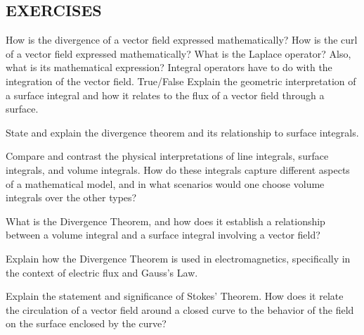 \begin{mdframed}[ backgroundcolor=lightblue, linewidth=1pt, hidealllines=true]
\section{EXERCISES}
\begin{ExerciseList}
\Exercise[label={ex171}] 
How is the divergence of a vector field expressed mathematically?
\Exercise[label={ex172}] 
How is the curl of a vector field expressed mathematically?
\Exercise[label={ex173}] 
What is the Laplace operator? Also, what is its mathematical expression?
\Exercise[label={ex174}]  Integral operators have to do with the integration of the vector field. True/False
\Exercise[label={ex175}]
Explain the geometric interpretation of a surface integral and how it relates to the flux of a vector field through a surface.


\Exercise[label={ex176}]
State and explain the divergence theorem and its relationship to surface integrals.


\Exercise[label={ex178}] 
Compare and contrast the physical interpretations of line integrals, surface integrals, and volume integrals. How do these integrals capture different aspects of a mathematical model, and in what scenarios would one choose volume integrals over the other types?


\Exercise[label={ex179}] 
What is the Divergence Theorem, and how does it establish a relationship between a volume integral and a surface integral involving a vector field?

\Exercise[label={ex1710}] 
Explain how the Divergence Theorem is used in electromagnetics, specifically in the context of electric flux and Gauss's Law.



\Exercise[label={ex1712}] 
Explain the statement and significance of Stokes' Theorem. How does it relate the circulation of a vector field around a closed curve to the behavior of the field on the surface enclosed by the curve?


\end{ExerciseList}
\end{mdframed}
